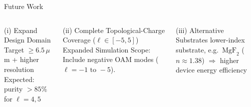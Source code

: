 \documentclass[aspectratio=169, 10pt]{beamer}
\begin{document}
 


\begin{frame}{Future Work}
  \begin{columns}[T]
      \begin{block}{(i) Expand Design Domain}
        Target $\ge6.5\,\mu$m + higher resolution\\
        Expected: purity $>85\%$ for $\ell=4,5$
      \end{block}
      \vspace{1pt}
	\begin{block}{(ii) Complete Topological-Charge Coverage ($\ell \in [-5, 5]$)} 
		Expanded Simulation Scope: Include negative OAM modes ($\ell = -1 \text{ to } -5$).
	\end{block}
      \vspace{1pt}
      \begin{block}{(iii) Alternative Substrates}
        lower-index substrate, e.g.\ $\text{MgF}_2$ ($n\approx1.38$) $\Rightarrow$ higher device energy efficiency
      \end{block}
  \end{columns}
\end{frame}

  

\end{document}
